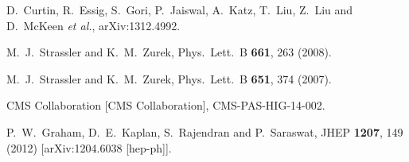 \documentclass[aps,prl,twocolumn,preprintnumbers,groupedaddress,nofootinbib]{revtex4}
\begin{document}
\begin{thebibliography}{99}
  D.~Curtin, R.~Essig, S.~Gori, P.~Jaiswal, A.~Katz, T.~Liu, Z.~Liu and D.~McKeen {\it et al.},
  arXiv:1312.4992. %
  
  M.~J.~Strassler and K.~M.~Zurek,
  Phys.\ Lett.\ B {\bf 661}, 263 (2008).
  
  M.~J.~Strassler and K.~M.~Zurek,
  Phys.\ Lett.\ B {\bf 651}, 374 (2007).
  

  CMS Collaboration [CMS Collaboration],
  CMS-PAS-HIG-14-002.
  
  P.~W.~Graham, D.~E.~Kaplan, S.~Rajendran and P.~Saraswat,
  JHEP {\bf 1207}, 149 (2012)
  [arXiv:1204.6038 [hep-ph]].
  

\end{thebibliography}
\end{document}
